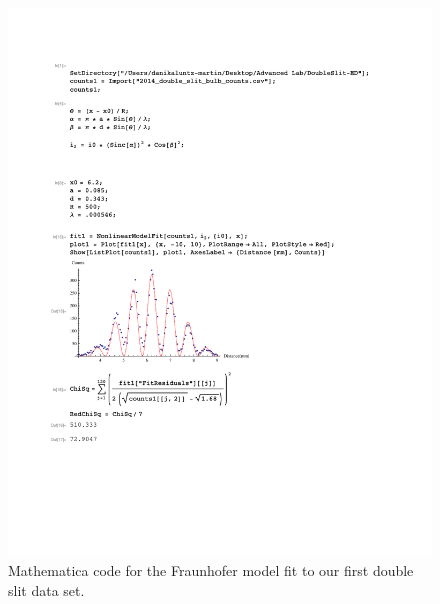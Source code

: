 \documentclass[prb,preprint]{revtex4-1}
\begin{document}
\begin{figure}[h!]
\centering
\includegraphics[width=6in]{DoubleSlitFraun1.pdf}
\caption{Mathematica code for the Fraunhofer model fit to our first double slit data set.}
\label{DoubleSlitFraun1}
\end{figure}
\end{document}
